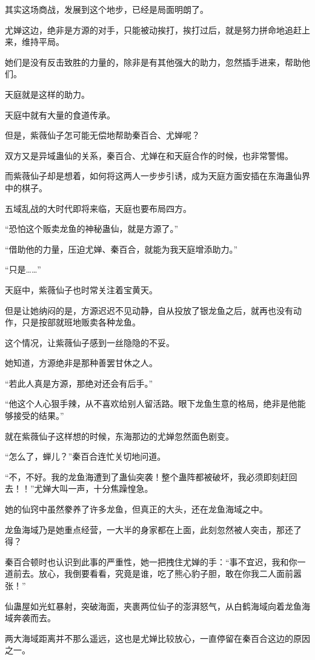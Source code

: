 \begin{this_body}
其实这场商战，发展到这个地步，已经是局面明朗了。

尤婵这边，绝非是方源的对手，只能被动挨打，挨打过后，就是努力拼命地追赶上来，维持平局。

她们是没有反击致胜的力量的，除非是有其他强大的助力，忽然插手进来，帮助他们。

天庭就是这样的助力。

天庭中就有大量的食道传承。

但是，紫薇仙子怎可能无偿地帮助秦百合、尤婵呢？

双方又是异域蛊仙的关系，秦百合、尤婵在和天庭合作的时候，也非常警惕。

而紫薇仙子却是想着，如何将这两人一步步引诱，成为天庭方面安插在东海蛊仙界中的棋子。

五域乱战的大时代即将来临，天庭也要布局四方。

“恐怕这个贩卖龙鱼的神秘蛊仙，就是方源了。”

“借助他的力量，压迫尤婵、秦百合，就能为我天庭增添助力。”

“只是……”

天庭中，紫薇仙子也时常关注着宝黄天。

但是让她纳闷的是，方源迟迟不见动静，自从投放了银龙鱼之后，就再也没有动作，只是按部就班地贩卖各种龙鱼。

这个情况，让紫薇仙子感到一丝隐隐的不妥。

她知道，方源绝非是那种善罢甘休之人。

“若此人真是方源，那绝对还会有后手。”

“他这个人心狠手辣，从不喜欢给别人留活路。眼下龙鱼生意的格局，绝非是他能够接受的结果。”

就在紫薇仙子这样想的时候，东海那边的尤婵忽然面色剧变。

“怎么了，蝉儿？”秦百合连忙关切地问道。

“不，不好。我的龙鱼海遭到了蛊仙突袭！整个蛊阵都被破坏，我必须即刻赶回去！！”尤婵大叫一声，十分焦躁惶急。

她的仙窍中虽然豢养了许多龙鱼，但真正的大头，还在龙鱼海域之中。

龙鱼海域乃是她重点经营，一大半的身家都在上面，此刻忽然被人突击，那还了得？

秦百合顿时也认识到此事的严重性，她一把拽住尤婵的手：“事不宜迟，我和你一道前去。放心，我倒要看看，究竟是谁，吃了熊心豹子胆，敢在你我二人面前嚣张！”

仙蛊屋如光虹暴射，突破海面，夹裹两位仙子的澎湃怒气，从白鹤海域向着龙鱼海域奔袭而去。

两大海域距离并不那么遥远，这也是尤婵比较放心，一直停留在秦百合这边的原因之一。


\end{this_body}
